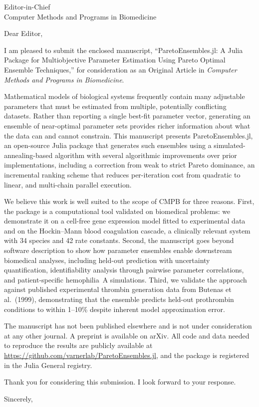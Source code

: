 \documentclass[12pt]{letter}
\date{\today}
\begin{document}
\begin{letter}{Editor-in-Chief\\
Computer Methods and Programs in Biomedicine}

\opening{Dear Editor,}

I am pleased to submit the enclosed manuscript, ``ParetoEnsembles.jl: A Julia Package for Multiobjective Parameter Estimation Using Pareto Optimal Ensemble Techniques,'' for consideration as an Original Article in \textit{Computer Methods and Programs in Biomedicine}.

Mathematical models of biological systems frequently contain many adjustable parameters that must be estimated from multiple, potentially conflicting datasets. Rather than reporting a single best-fit parameter vector, generating an ensemble of near-optimal parameter sets provides richer information about what the data can and cannot constrain. This manuscript presents ParetoEnsembles.jl, an open-source Julia package that generates such ensembles using a simulated-annealing-based algorithm with several algorithmic improvements over prior implementations, including a correction from weak to strict Pareto dominance, an incremental ranking scheme that reduces per-iteration cost from quadratic to linear, and multi-chain parallel execution.

We believe this work is well suited to the scope of CMPB for three reasons. First, the package is a computational tool validated on biomedical problems: we demonstrate it on a cell-free gene expression model fitted to experimental data and on the Hockin--Mann blood coagulation cascade, a clinically relevant system with 34 species and 42 rate constants. Second, the manuscript goes beyond software description to show how parameter ensembles enable downstream biomedical analyses, including held-out prediction with uncertainty quantification, identifiability analysis through pairwise parameter correlations, and patient-specific hemophilia~A simulations. Third, we validate the approach against published experimental thrombin generation data from Butenas et al.\ (1999), demonstrating that the ensemble predicts held-out prothrombin conditions to within 1--10\% despite inherent model approximation error.

The manuscript has not been published elsewhere and is not under consideration at any other journal. A preprint is available on arXiv. All code and data needed to reproduce the results are publicly available at \url{https://github.com/varnerlab/ParetoEnsembles.jl}, and the package is registered in the Julia General registry.

Thank you for considering this submission. I look forward to your response.

\closing{Sincerely,}

\end{letter}
\end{document}

